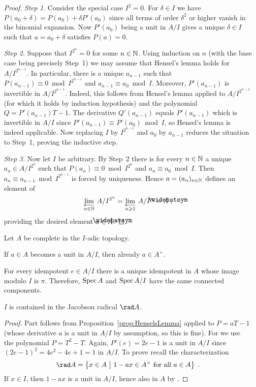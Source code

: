 \documentclass[a4paper,parskip=half,numbers=enddot, DIV=12]{scrreprt}
\renewcommand{\geq}{\geqslant}
\begin{document}
\begin{proof}
	\emph{Step 1.} Consider the special case $I^2=0$. For $\delta\in I$ we have $P(a_0+\delta)=P(a_0)+\delta P'(a_0)$ since all terms of order $\delta^2$ or higher vanish in the binomial expansion. Now $P'(a_0)$ being a unit in $A/I$ gives a unique $\delta\in I$ such that $a=a_0+\delta$ satisfies $P(a)=0$.
	
	\emph{Step 2.} Suppose that $I^{2^n}=0$ for some $n\in \mathbb{N}$. Using induction on $n$ (with the base case being precisely Step~1) we may assume that Hensel's lemma holds for $A/I^{2^{n-1}}$. In particular, there is a unique $a_{n-1}$ such that $P(a_{n-1})\equiv 0\bmod I^{2^{n-1}}$ and $a_{n-1}\equiv a_0\bmod I$. Moreover, $P'(a_{n-1})$ is invertible in $A/I^{2^{n-1}}$. Indeed, this follows from Hensel's lemma applied to $A/I^{2^{n-1}}$ (for which it holds by induction hypothesis) and the polynomial $Q=P'(a_{n-1})T-1$. The derivative $Q'(a_{n-1})$ equals $P'(a_{n-1})$ which is invertible in $A/I$ since $P'(a_{n-1})\equiv P'(a_0)\bmod I$, so Hensel's lemma is indeed applicable. Now replacing $I$ by $I^{2^{n-1}}$ and $a_0$ by $a_{n-1}$ reduces the situation to Step~1, proving the inductive step.
	
	\emph{Step 3.} Now let $I$ be arbitrary. By Step~2 there is for every $n\in\mathbb{N}$ a unique $a_n\in A/I^{2^n}$ such that $P(a_n)\equiv 0\bmod I^{2^n}$ and $a_n\equiv a_0\bmod I$. Then $a_n\equiv a_{n-1}\bmod I^{2^{n-1}}$ is forced by uniqueness. Hence $a=(a_n)_{n\in \mathbb{N}}$ defines an element of
	\begin{align*}
		\limit[n\in \IN]A/I^{2^n}=\limit[n\geq 1] A/I^n=\roof{A}\;,
	\end{align*}
	providing the desired element $a\in\roof{A}$.
\end{proof}
\begin{cor}
	Let $A$ be complete in the $I$-adic topology.
	\begin{alphanumerate}
		\item If $a\in A$ becomes a unit in $A/I$, then already $a\in A^\times$.
		\item For every idempotent $e\in A/I$ there is a unique idempotent in $A$ whose image modulo $I$ is $\pi $. Therefore, $\operatorname{Spec} A$ and $\operatorname{Spec} A/I$ have the same connected components.
		\item $I$ is contained in the Jacobson radical $\rad A$.
	\end{alphanumerate}
\end{cor}
\begin{proof}
	Part  follows from Proposition~\ref{prop:HenselsLemma} applied to $P=aT-1$ (whose derivative $a$ is a unit in $A/I$ by assumption, so this is fine). For  we use the polynomial $P=T^2-T$. Again, $P'(e)=2e -1$ is a unit in $A/I$ since $(2e -1)^2=4e ^2-4e +1=1$ in $A/I$. To prove  recall the characterization
	\begin{align*}
		\rad A=\left\{x\in A\st 1-ax\in A^\times\text{ for all }a\in A\right\}\;.
	\end{align*}
	If $x\in I$, then $1-ax$ is a unit in $A/I$, hence also in $A$ by .
\end{proof}
\end{document}
